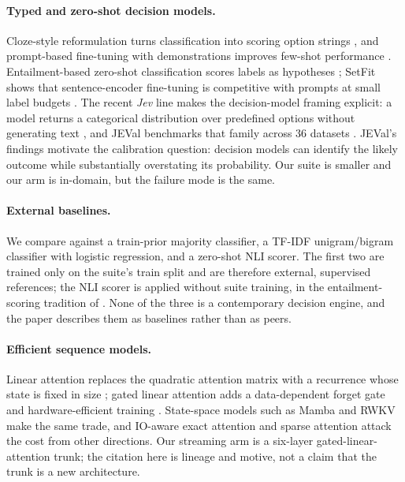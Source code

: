 \paragraph{Typed and zero-shot decision models.}
Cloze-style reformulation turns classification into scoring option strings \cite{schick2021pet}, and prompt-based fine-tuning with demonstrations improves few-shot performance \cite{gao2021lmbff}. Entailment-based zero-shot classification scores labels as hypotheses \cite{yin2019benchmarking}; SetFit shows that sentence-encoder fine-tuning is competitive with prompts at small label budgets \cite{tunstall2022setfit}. The recent \emph{Jev} line makes the decision-model framing explicit: a model returns a categorical distribution over predefined options without generating text \cite{li2026jev}, and JEVal benchmarks that family across 36 datasets \cite{duan2026gdm}. JEVal's findings motivate the calibration question: decision models can identify the likely outcome while substantially overstating its probability. Our suite is smaller and our arm is in-domain, but the failure mode is the same.

\paragraph{External baselines.}
We compare against a train-prior majority classifier, a TF-IDF unigram/bigram classifier with logistic regression, and a zero-shot NLI scorer. The first two are trained only on the suite's train split and are therefore external, supervised references; the NLI scorer is applied without suite training, in the entailment-scoring tradition of \cite{yin2019benchmarking}. None of the three is a contemporary decision engine, and the paper describes them as baselines rather than as peers.

\paragraph{Efficient sequence models.}
Linear attention replaces the quadratic attention matrix with a recurrence whose state is fixed in size \cite{katharopoulos2020transformers}; gated linear attention adds a data-dependent forget gate and hardware-efficient training \cite{yang2024gla}. State-space models such as Mamba \cite{gu2024mamba} and RWKV \cite{peng2023rwkv} make the same trade, and IO-aware exact attention \cite{dao2022flashattention} and sparse attention \cite{beltagy2020longformer} attack the cost from other directions. Our streaming arm is a six-layer gated-linear-attention trunk; the citation here is lineage and motive, not a claim that the trunk is a new architecture.

